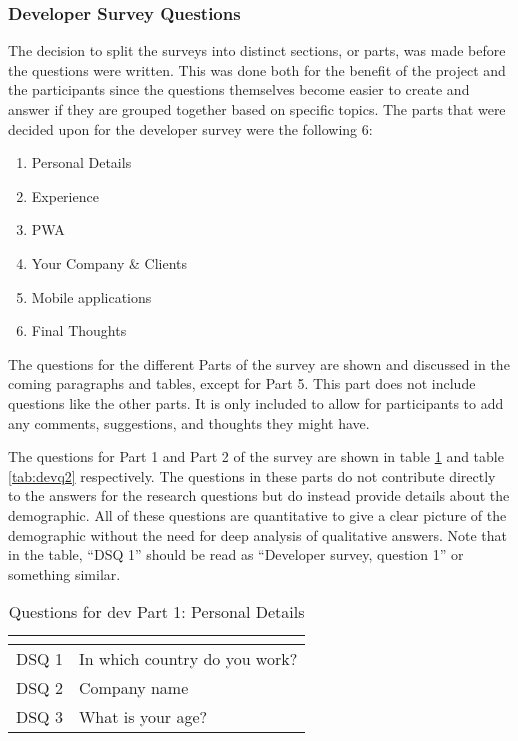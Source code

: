 \documentclass[a4paper,12pt]{article}
\begin{document}
\subsubsection{Developer Survey Questions}
The decision to split the surveys into distinct sections, or parts, was made before the questions were written. This was done both for the benefit of the project and the participants since the questions themselves become easier to create and answer if they are grouped together based on specific topics. The parts that were decided upon for the developer survey were the following 6:

\begin{enumerate}
    \item Personal Details
    \item Experience
    \item PWA
    \item Your Company \& Clients
    \item Mobile applications
    \item Final Thoughts
\end{enumerate}

The questions for the different Parts of the survey are shown and discussed in the coming paragraphs and tables, except for Part 5. This part does not include questions like the other parts. It is only included to allow for participants to add any comments, suggestions, and thoughts they might have.

The questions for Part 1 and Part 2 of the survey are shown in table \ref{tab:devq1} and table \ref{tab:devq2} respectively. The questions in these parts do not contribute directly to the answers for the research questions but do instead provide details about the demographic. All of these questions are quantitative to give a clear picture of the demographic without the need for deep analysis of qualitative answers. Note that in the table, “DSQ 1” should be read as “Developer survey, question 1” or something similar.

\begin{table}[h]
\centering
{}
\begin{tabular}{|l|l|}
\hline
\rowcolor[HTML]{656565} 
\multicolumn{1}{|c|}{\cellcolor[HTML]{656565}{\color[HTML]{FFFFFF} Number}} & \multicolumn{1}{l|}{\cellcolor[HTML]{656565}{\color[HTML]{FFFFFF} Question}} \\ \hline
DSQ 1 & In which country do you work? \\
DSQ 2 & Company name \\
DSQ 3 & What is your age? \\
\hline
\end{tabular}
\caption{Questions for dev Part 1: Personal Details}
\label{tab:devq1}
\end{table}
\end{document}
